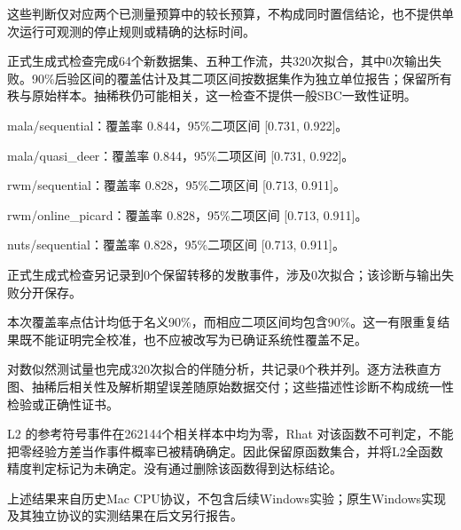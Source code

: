 这些判断仅对应两个已测量预算中的较长预算，不构成同时置信结论，也不提供单次运行可观测的停止规则或精确的达标时间。

正式生成式检查完成64个新数据集、五种工作流，共320次拟合，其中0次输出失败。90\%后验区间的覆盖估计及其二项区间按数据集作为独立单位报告；保留所有秩与原始样本。抽稀秩仍可能相关，这一检查不提供一般SBC一致性证明。

\noindent mala/sequential：覆盖率 0.844，95\%二项区间 [0.731, 0.922]。\par

\noindent mala/quasi\_deer：覆盖率 0.844，95\%二项区间 [0.731, 0.922]。\par

\noindent rwm/sequential：覆盖率 0.828，95\%二项区间 [0.713, 0.911]。\par

\noindent rwm/online\_picard：覆盖率 0.828，95\%二项区间 [0.713, 0.911]。\par

\noindent nuts/sequential：覆盖率 0.828，95\%二项区间 [0.713, 0.911]。\par

正式生成式检查另记录到0个保留转移的发散事件，涉及0次拟合；该诊断与输出失败分开保存。

本次覆盖率点估计均低于名义90\%，而相应二项区间均包含90\%。这一有限重复结果既不能证明完全校准，也不应被改写为已确证系统性覆盖不足。

对数似然测试量也完成320次拟合的伴随分析，共记录0个秩并列。逐方法秩直方图、抽稀后相关性及解析期望误差随原始数据交付；这些描述性诊断不构成统一性检验或正确性证书。

L2 的参考符号事件在262144个相关样本中均为零，Rhat 对该函数不可判定，不能把零经验方差当作事件概率已被精确确定。因此保留原函数集合，并将L2全函数精度判定标记为未确定。没有通过删除该函数得到达标结论。

上述结果来自历史Mac CPU协议，不包含后续Windows实验；原生Windows实现及其独立协议的实测结果在后文另行报告。
